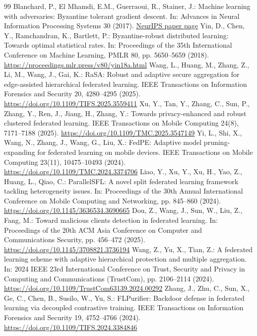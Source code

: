 \documentclass[11pt, a4paper]{article}
\begin{document}
\begin{thebibliography}{99}
     Blanchard, P., El Mhamdi, E.M., Guerraoui, R., Stainer, J.: Machine learning with adversaries: Byzantine tolerant gradient descent. In: Advances in Neural Information Processing Systems 30 (2017). \href{https://papers.nips.cc/paper/6617-machine-learning-with-adversaries-byzantine-tolerant-gradient-descent}{NeurIPS paper page}
     Yin, D., Chen, Y., Ramchandran, K., Bartlett, P.: Byzantine-robust distributed learning: Towards optimal statistical rates. In: Proceedings of the 35th International Conference on Machine Learning, PMLR 80, pp. 5650--5659 (2018). \url{https://proceedings.mlr.press/v80/yin18a.html}
     Wang, L., Huang, M., Zhang, Z., Li, M., Wang, J., Gai, K.: RaSA: Robust and adaptive secure aggregation for edge-assisted hierarchical federated learning. IEEE Transactions on Information Forensics and Security 20, 4280--4295 (2025). \url{https://doi.org/10.1109/TIFS.2025.3559411}
     Xu, Y., Tan, Y., Zhang, C., Sun, P., Zhang, Y., Ren, J., Jiang, H., Zhang, Y.: Towards privacy-enhanced and robust clustered federated learning. IEEE Transactions on Mobile Computing 24(8), 7171--7188 (2025). \url{https://doi.org/10.1109/TMC.2025.3547149}
     Yi, L., Shi, X., Wang, N., Zhang, J., Wang, G., Liu, X.: FedPE: Adaptive model pruning-expanding for federated learning on mobile devices. IEEE Transactions on Mobile Computing 23(11), 10475--10493 (2024). \url{https://doi.org/10.1109/TMC.2024.3374706}
     Liao, Y., Xu, Y., Xu, H., Yao, Z., Huang, L., Qiao, C.: ParallelSFL: A novel split federated learning framework tackling heterogeneity issues. In: Proceedings of the 30th Annual International Conference on Mobile Computing and Networking, pp. 845--860 (2024). \url{https://doi.org/10.1145/3636534.3690665}
     Dou, Z., Wang, J., Sun, W., Liu, Z., Fang, M.: Toward malicious clients detection in federated learning. In: Proceedings of the 20th ACM Asia Conference on Computer and Communications Security, pp. 456--472 (2025). \url{https://doi.org/10.1145/3708821.3736194}
     Wang, Z., Yu, X., Tian, Z.: A federated learning scheme with adaptive hierarchical protection and multiple aggregation. In: 2024 IEEE 23rd International Conference on Trust, Security and Privacy in Computing and Communications (TrustCom), pp. 2106--2114 (2024). \url{https://doi.org/10.1109/TrustCom63139.2024.00292}
     Zhang, J., Zhu, C., Sun, X., Ge, C., Chen, B., Susilo, W., Yu, S.: FLPurifier: Backdoor defense in federated learning via decoupled contrastive training. IEEE Transactions on Information Forensics and Security 19, 4752--4766 (2024). \url{https://doi.org/10.1109/TIFS.2024.3384846}

\end{thebibliography}
\end{document}
